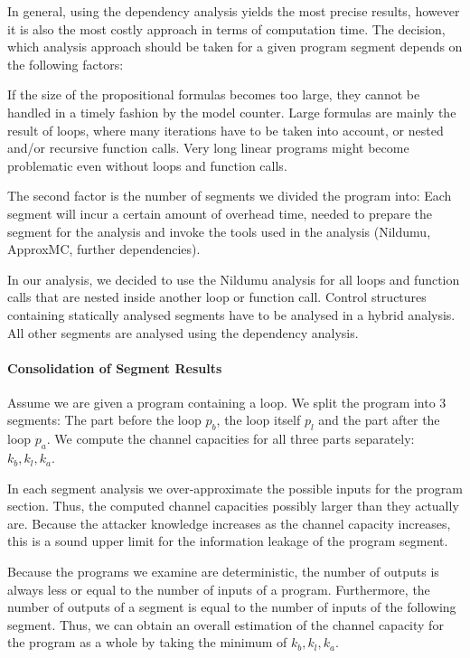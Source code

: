 In general, using the dependency analysis yields the most precise results, however it is also the most costly approach in terms of computation time. The decision, which analysis approach should be taken for a given program segment depends on the following factors:

If the size of the propositional formulas becomes too large, they cannot be handled in a timely fashion by the model counter. Large formulas are mainly the result of loops, where many iterations have to be taken into account, or nested and/or recursive function calls. Very long linear programs might become problematic even without loops and function calls.

The second factor is the number of segments we divided the program into: Each segment will incur a certain amount of overhead time, needed to prepare the segment for the analysis and invoke the tools used in the analysis (Nildumu, ApproxMC, further dependencies).

In our analysis, we  decided to use the Nildumu analysis for all loops and function calls that are nested inside another loop or function call. Control structures containing statically analysed segments have to be analysed in a hybrid analysis. All other segments are analysed using the dependency analysis.


\paragraph{Consolidation of Segment Results}
Assume we are given a program containing a loop. We split the program into 3 segments: The part before the loop $p_b$, the loop itself $p_l$ and the part after the loop $p_a$.
We compute the channel capacities for all three parts separately: $k_b, k_l, k_a$.

In each segment analysis we over-approximate the possible inputs for the program section. Thus, the computed channel capacities possibly larger than they actually are. Because the attacker knowledge increases as the channel capacity increases, this is a sound upper limit for the information leakage of the program segment.

Because the programs we examine are deterministic, the number of outputs is always less or equal to the number of inputs of a program. Furthermore, the number of outputs of a segment is equal to the number of inputs of the following segment. Thus, we can obtain an overall estimation of the channel capacity for the program as a whole by taking the minimum of $k_b, k_l, k_a$.

